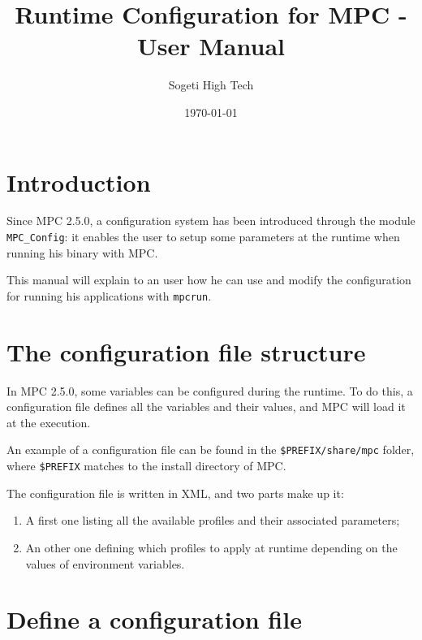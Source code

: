 \documentclass{article}
\author{Sogeti High Tech}
\title{Runtime Configuration for MPC - User Manual}
\date{\today}
\begin{document}
\hypersetup{pageanchor=false,citecolor=blue}
\maketitle

\newpage
{}
\tableofcontents
\newpage
{}
\hypersetup{pageanchor=true,citecolor=blue}

\section{Introduction}

Since MPC 2.5.0, a configuration system has been introduced through the module \texttt{MPC\_Config}: it enables the user to setup some parameters at the runtime when running his binary with MPC.
\newline

\noindent This manual will explain to an user how he can use and modify the configuration for running his applications with \texttt{mpcrun}.

\section {The configuration file structure}

In MPC 2.5.0, some variables can be configured during the runtime. To do this, a configuration file defines all the variables and their values, and MPC will load it at the execution.
\newline

\noindent An example of a configuration file can be found in the \texttt{\$PREFIX/share/mpc} folder, where \texttt{\$PREFIX} matches to the install directory of MPC.
\newline

\noindent The configuration file is written in XML, and two parts make up it:
\begin{enumerate}
\item A first one listing all the available profiles and their associated parameters;
\item An other one defining which profiles to apply at runtime depending on the values of environment variables.
\end{enumerate}

\section{Define a configuration file}
\end{document}
